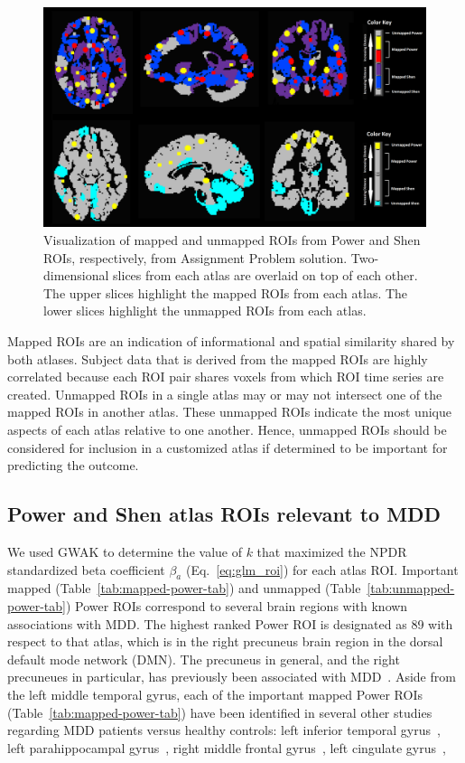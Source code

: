 \documentclass[10pt,letterpaper]{article}\usepackage[]{graphicx}\usepackage[]{color}
\begin{document}
\begin{figure}[h!]
	\centering
	\includegraphics[width=1\textwidth,clip,trim=0cm 0cm 0cm 0.0cm]{mapped-unmapped-montage.png}
	\caption{Visualization of mapped and unmapped ROIs from Power and Shen ROIs, respectively, from Assignment Problem solution. Two-dimensional slices from each atlas are overlaid on top of each other. The upper slices highlight the mapped ROIs from each atlas. The lower slices highlight the unmapped ROIs from each atlas.}\label{fig:power_shen_mapped-unmapped}
\end{figure}

Mapped ROIs are an indication of informational and spatial similarity shared by both atlases. Subject data that is derived from the mapped ROIs are highly correlated because each ROI pair shares voxels from which ROI time series are created. Unmapped ROIs in a single atlas may or may not intersect one of the mapped ROIs in another atlas. These unmapped ROIs indicate the most unique aspects of each atlas relative to one another. Hence, unmapped ROIs should be considered for inclusion in a customized atlas if determined to be important for predicting the outcome.

\subsection{Power and Shen atlas ROIs relevant to MDD}
We used GWAK to determine the value of $k$ that maximized the NPDR standardized beta coefficient $\beta_a$ (Eq.~\ref{eq:glm_roi}) for each atlas ROI. Important mapped (Table~\ref{tab:mapped-power-tab}) and unmapped (Table~\ref{tab:unmapped-power-tab}) Power ROIs correspond to several brain regions with known associations with MDD. The highest ranked Power ROI is designated as 89 with respect to that atlas, which is in the right precuneus brain region in the dorsal default mode network (DMN). The precuneus in general, and the right precuneues in particular, has previously been associated with MDD~\cite{cheng2018,dutta2019,liu2017}. Aside from the left middle temporal gyrus, each of the important mapped Power ROIs (Table~\ref{tab:mapped-power-tab}) have been identified in several other studies regarding MDD patients versus healthy controls: left inferior temporal gyrus~\cite{ramezani2014,rolls2017}, left parahippocampal gyrus~\cite{ramezani2014,zeng2012}, right middle frontal gyrus~\cite{reynolds2014,fitzgerald2008}, left cingulate gyrus~\cite{hamani2011,mclaren2016}, 
\end{document}
